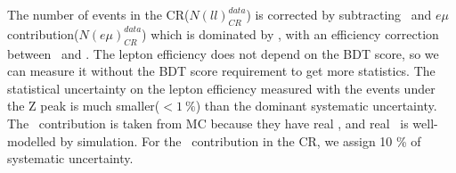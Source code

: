 The number of events in the CR($N(ll)_{CR}^{data}$) is corrected by subtracting
\vv\ and $e\mu$ contribution($N(e\mu)_{CR}^{data}$) which is dominated by \topbkg, 
with an efficiency correction between \SF\ and \DF. The lepton efficiency does not depend 
on the BDT score, so we can measure it without the BDT score requirement 
to get more statistics. The statistical uncertainty on the lepton efficiency 
measured with the events under the Z peak is
much smaller($< 1~\%$) than the dominant systematic uncertainty. 
The \vv\ contribution is taken from MC because they have real \met, 
and real \met\ is well-modelled by simulation.
For the \vv\ contribution in the CR, we assign 10 \% of systematic uncertainty.  

